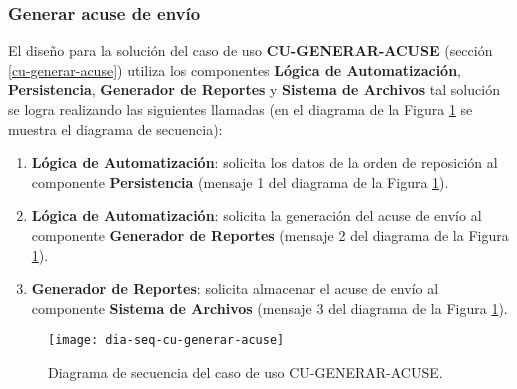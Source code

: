 \subsubsection{Generar acuse de envío}
El diseño para la solución del caso de uso \textbf{CU-GENERAR-ACUSE} (sección \ref{cu-generar-acuse}) utiliza los componentes \textbf{Lógica de Automatización}, \textbf{Persistencia}, \textbf{Generador de Reportes} y \textbf{Sistema de Archivos} tal solución se logra realizando las siguientes llamadas (en el diagrama de la Figura \ref{fig:dia-seq-cu-generar-acuse} se muestra el diagrama de secuencia):
\begin{enumerate}
	\item \textbf{Lógica de Automatización}: solicita los datos de la orden de reposición al componente \textbf{Persistencia} (mensaje 1 del diagrama de la Figura \ref{fig:dia-seq-cu-generar-acuse}).
	\item \textbf{Lógica de Automatización}: solicita la generación del acuse de envío al componente \textbf{Generador de Reportes} (mensaje 2 del diagrama de la Figura \ref{fig:dia-seq-cu-generar-acuse}).
	\item \textbf{Generador de Reportes}: solicita almacenar el acuse de envío al componente \textbf{Sistema de Archivos} (mensaje 3 del diagrama de la Figura \ref{fig:dia-seq-cu-generar-acuse}).
\end{enumerate}

\begin{figure}[h]
	\centering
	\texttt{[image: dia-seq-cu-generar-acuse]}
	\caption{Diagrama de secuencia del caso de uso CU-GENERAR-ACUSE.}
	\label{fig:dia-seq-cu-generar-acuse}
\end{figure}


